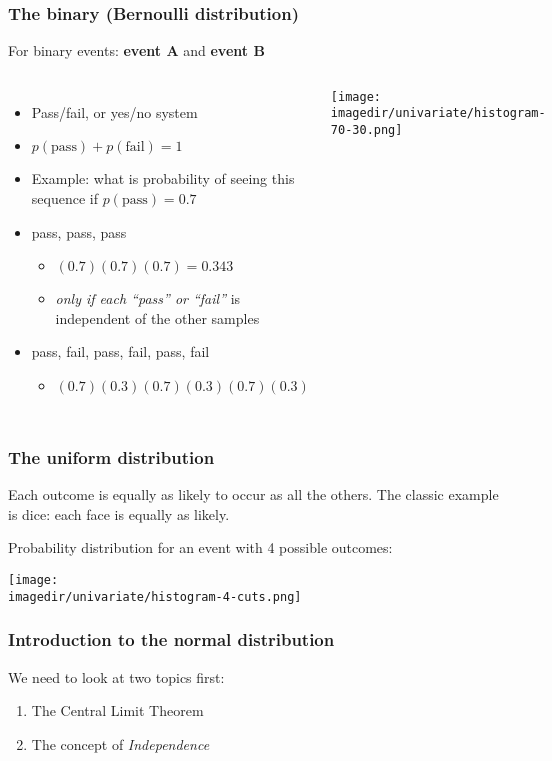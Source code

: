 \begin{frame}\frametitle{The \textbf{binary} (Bernoulli distribution)}
	For binary events: \textbf{event A} and \textbf{event B}
	\begin{columns}
		\column{6cm}
		\begin{itemize}
			\item	Pass/fail, or yes/no system
			\item	$p(\text{pass}) + p(\text{fail}) = 1$
			\item	Example: what is probability of seeing this sequence if $p(\text{pass}) = 0.7$
			\item	pass, pass, pass
			\begin{itemize}
				\item	$(0.7)(0.7)(0.7) = 0.343$
				\item	\emph{only if each ``pass'' or ``fail''} is independent of the other samples
			\end{itemize}
			\item	pass, fail, pass, fail, pass, fail
			\begin{itemize}
				\item	$(0.7)(0.3)(0.7)(0.3)(0.7)(0.3)$
			\end{itemize}
		\end{itemize}
		\column{5cm}
		\texttt{[image: \\imagedir/univariate/histogram-70-30.png]}
	\end{columns}
\end{frame}

\begin{frame}\frametitle{The \textbf{uniform} distribution}
	Each outcome is equally as likely to occur as all the others. The classic example is dice: each face is equally as likely.

	Probability distribution for an event with 4 possible outcomes:
	\begin{center}
		\texttt{[image: \\imagedir/univariate/histogram-4-cuts.png]}
	\end{center}
\end{frame}

\begin{frame}\frametitle{Introduction to the \textbf{normal} distribution}

	We need to look at two topics first:
	\begin{enumerate}
		\item	The Central Limit Theorem
		\item	The concept of \emph{Independence}
	\end{enumerate}
\end{frame}

